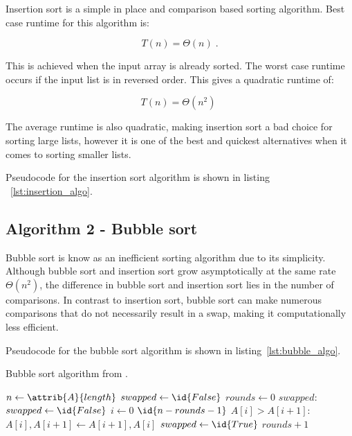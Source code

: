 \documentclass[sigconf, nonacm, natbib, screen, balance=False]{acmart}
\begin{document}
Insertion sort is a simple in place and comparison based sorting algorithm. Best case runtime for this algorithm is:

\begin{equation}
  T(n) = \Theta(n) \;.  \label{eq:ins_sort_best}
\end{equation}

This is achieved when the input array is already sorted. The worst case runtime occurs if the input list is in reversed order. This gives a quadratic runtime of:

\begin{equation}
  T(n) = \Theta(n^2) \;  \label{eq:ins_sort_best}
\end{equation}

The average runtime is also quadratic, making insertion sort a bad choice for sorting large lists, however it is one of the best and quickest alternatives when it comes to sorting smaller lists. 

Pseudocode for the insertion sort algorithm is shown in
listing ~\ref{lst:insertion_algo}. 

\subsection{Algorithm 2 - Bubble sort}\label{sec:algo2}

Bubble sort is know as an inefficient sorting algorithm due to its simplicity. Although bubble sort and insertion sort  grow asymptotically at the same rate $\Theta(n^2)$, the difference in bubble sort and insertion sort lies in the number of comparisons. In contrast to insertion sort, bubble sort can make numerous comparisons that do not necessarily result in a swap, making it computationally less efficient.

Pseudocode for the bubble sort algorithm is shown in listing~\ref{lst:bubble_algo}. 

\begin{listing}
  \caption{Bubble sort algorithm from \citet[Ch.~2.1]{CLRS_2009}.}
  \label{lst:bubble_algo}

  \begin{codebox}
    \li $n \gets \attrib{A}{length}$
    \li $swapped \gets \id{False}$
    \li $rounds \gets 0$
    \li \While $swapped:$
    \li \Do
    $swapped \gets \id{False}$
    \li \For $i \gets 0 $ \To $\id{n - rounds - 1}$
    \li     \Do
    \If $A[i] > A[i+1]:$
    \li     \Do
    $A[i], A[i+1] \gets A[i+1], A[i]$
    \li $swapped \gets \id{True}$
    \End
    \End    
    \li       $rounds + 1$
    \End
  \end{codebox}
\end{listing}
\end{document}
